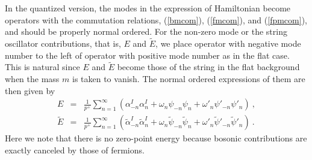 \documentclass[a4paper,12pt]{article}
\begin{document}
In the quantized version, the modes in the expression of Hamiltonian
become operators with the commutation relations, (\ref{bmcom}),
(\ref{fmcom}), and (\ref{fpmcom}), and should be properly normal
ordered.  For the non-zero mode or the string oscillator
contributions, that is, $E$ and $\tilde{E}$, we place operator with
negative mode number to the left of operator with positive mode number
as in the flat case.  This is natural since $E$ and $\tilde{E}$
become those of the string in the flat background when the mass $m$ is
taken to vanish.  The normal ordered expressions of them are then
given by
\begin{eqnarray}
E &=& \frac{1}{p^+} \sum^\infty_{n =1} 
  ( \alpha^I_{-n} \alpha^I_n  
   + \omega_n \psi_{-n} \psi_n
   + \omega'_n \psi'_{-n} \psi'_n
  )~,
  \nonumber \\
\tilde{E}
  &=& \frac{1}{p^+} \sum^\infty_{n =1} 
  ( \tilde{\alpha}^I_{-n} \tilde{\alpha}^I_n  
   + \omega_n \tilde{\psi}_{-n} \tilde{\psi}_n
   + \omega'_n \tilde{\psi}'_{-n} \tilde{\psi}'_n
  )~.
\label{nzero-h}
\end{eqnarray}
Here we note that there is no zero-point energy because bosonic
contributions are exactly canceled by those of fermions.
\end{document}
